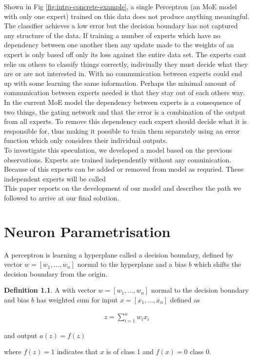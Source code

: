 \documentclass[notitlepage]{report}
\theoremstyle{definition}
\newtheorem{definition}{Definition}[section]
\begin{document}
Shown in Fig \ref{fig:intro-concrete-example}, a single Perceptron (an MoE model with only one expert) trained on this data does not produce anything meaningful. The classifier achieves a low error but the decision boundary has not captured any structure of the data. If training a number of experts which have no dependency between one another then any update made to the weights of an expert  is only based off only its loss against the entire data set. The experts cant relie on others to classify things correctly, indiviually they must decide what they are or are not interested in. With no communication between experts could end up with some learning the same information. Perhaps the minimal amount of communication between experts needed is that they stay out of each others way.\\

In the current MoE model the dependency between experts is a consequence of two things, the gating network and that the error is a combination of the output from all experts. To remove this dependency each expert should decide what it is responsible for, thus making it possible to train them separately using an error function which only considers their individual outputs. \\

To investigate this speculation, we developed a model based on the previous observations. Experts are trained independently without any comuinication. Because of this experts can be added or removed from model as requried. These independent experts will be called \\

This paper reports on the development of our model and describes the path we followed to arrive at our final solution.

\chapter{Neuron Parametrisation}
A perceptron is learning a hyperplane called a decision boundary, defined by vector $w = [w_1, ..., w_n]$ normal to the hyperplane and a bias $b$ which shifts the decision boundary from the origin.

\theoremstyle{definition}
\begin{definition}
	A  with vector $w = [w_1, ..., w_n]$ normal to the decision boundary and bias $b$ has weighted sum for input $x = [x_1, ..., x_n]$ defined as
	
	\begin{align*}
		z = \sum_{i=1}^{n} w_i x_i
	\end{align*}
	
	and output $a(z) = f(z)$
	
	where $f(z) = 1$ indicates that $x$ is of class 1 and $f(x) = 0$ class 0.
\end{definition}
\end{document}
